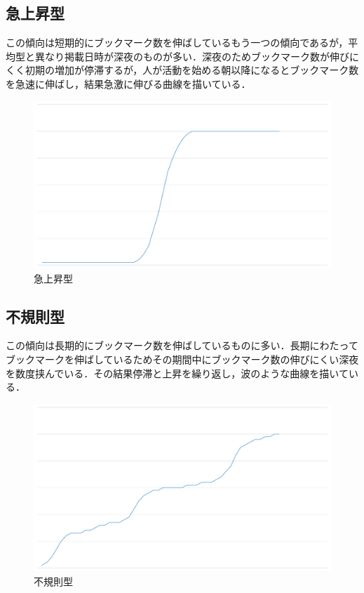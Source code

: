 \newpage

\subsection{急上昇型}
この傾向は短期的にブックマーク数を伸ばしているもう一つの傾向であるが，平均型と異なり掲載日時が深夜のものが多い．深夜のためブックマーク数が伸びにくく初期の増加が停滞するが，人が活動を始める朝以降になるとブックマーク数を急速に伸ばし，結果急激に伸びる曲線を描いている．

\begin{figure}[htb]
\centering
\includegraphics[width=13cm]{g2.pdf}
\caption{急上昇型}\label{g2}
\end{figure}

\newpage

\subsection{不規則型}
この傾向は長期的にブックマーク数を伸ばしているものに多い．長期にわたってブックマークを伸ばしているためその期間中にブックマーク数の伸びにくい深夜を数度挟んでいる．その結果停滞と上昇を繰り返し，波のような曲線を描いている．

\begin{figure}[htb]
\centering
\includegraphics[width=13cm]{g3.pdf}
\caption{不規則型}\label{g3}
\end{figure}

